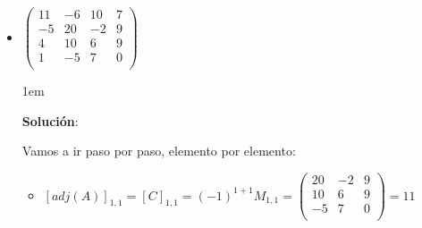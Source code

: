 \documentclass[12pt, fleqn]{article}                             %
\newenvironment{SmallIndentation}[1][0.75em]                    %
        {\begin{adjustwidth}{#1}{}\begin{footnotesize}}             %
        {\end{footnotesize}\end{adjustwidth}}                       %
\theoremstyle{break}                                            %
\newcommand{\pVector}[1]                                        %
        { \ensuremath{\begin{pmatrix}#1\end{pmatrix}} }             %
\begin{document}
\begin{itemize}
\begin{SmallIndentation}[1em]
\begin{itemize}
                
                \end{itemize}

                Por lo tanto $adj \pVector{
                9  & -11 & 5  & 6   & 9    \\
                10 & -3  & 15 & 18  & 12   \\
                6  & -7  & 10 & 8   & 21   \\
                -9 & 0   & 9  & -8  & 0    \\
                4  & 12  & -5 & -20 & -5   \\
                } = 
                \pVector{
                9 & 10 & 6 & -9 & 4\\
                -11 & -3 & -7 & 0 & 12\\
                5 & 15 & 10 & 9 & -5 \\
                6 & 18 & 8 & -8 & -20 \\
                9 & 12 & 21 & 0 & -5\\
                }$
                
            \end{SmallIndentation}

        \clearpage

        \item 
            $\pVector{
                11 & -6 & 10 & 7   \\ 
                -5 & 20 & -2 & 9   \\
                4  & 10 & 6 & 9    \\
                1  & -5 & 7 & 0    \\
                }$

            \begin{SmallIndentation}[1em]
                \textbf{Solución}:

                Vamos a ir paso por paso, elemento por elemento:
                \begin{itemize}
                    
                    \item
                        $[adj(A)]_{1, 1} 
                            = [C]_{1, 1} 
                            = (-1)^{1+1} M_{1, 1}
                            = \pVector{
                                    20 & -2 & 9   \\
                                    10 & 6 & 9    \\
                                    -5 & 7 & 0    \\
                                }
                            = 11$


\end{itemize}
\end{SmallIndentation}
\end{itemize}
\end{document}
